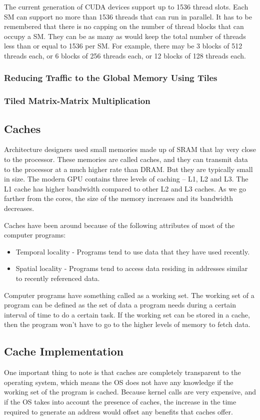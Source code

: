 \documentclass[../notes.tex]{subfiles}
\begin{document}
The current generation of CUDA devices support up to 1536 thread slots. Each SM can support no more than 1536 threads that can run in parallel. It has to be remembered that there is no capping on the number of thread blocks that can occupy a SM. They can be as many as would keep the total number of threads less than or equal to 1536 per SM. For example, there may be 3 blocks of 512 threads each, or 6 blocks of 256 threads each, or 12 blocks of 128 threads each.

\subsubsection{Reducing Traffic to the Global Memory Using Tiles}
\subsubsection{Tiled Matrix-Matrix Multiplication}

\subsection{Caches}
Architecture designers used small memories made up of SRAM that lay very close to the processor. These memories are called caches, and they can transmit data to the processor at a much higher rate than DRAM. But they are typically small in size. The modern GPU contains three levels of caching – L1, L2 and L3. The L1 cache has higher bandwidth compared to other L2 and L3 caches. As we go farther from the cores, the size of the memory increases and its bandwidth decreases.

Caches have been around because of the following attributes of most of the computer programs:
\begin{itemize}
\item Temporal locality - Programs tend to use data that they have used recently.
\item Spatial locality - Programs tend to access data residing in addresses similar to recently referenced data.
\end{itemize}

Computer programs have something called as a working set. The working set of a program can be defined as the set of data a program needs during a certain interval of time to do a certain task. If the working set can be stored in a cache, then the program won’t have to go to the higher levels of memory to fetch data.

\subsection{Cache Implementation}
One important thing to note is that caches are completely transparent to the operating system, which means the OS does not have any knowledge if the working set of the program is cached. Because kernel calls are very expensive, and if the OS takes into account the presence of caches, the increase in the time required to generate an address would offset any benefits that caches offer.
\end{document}
